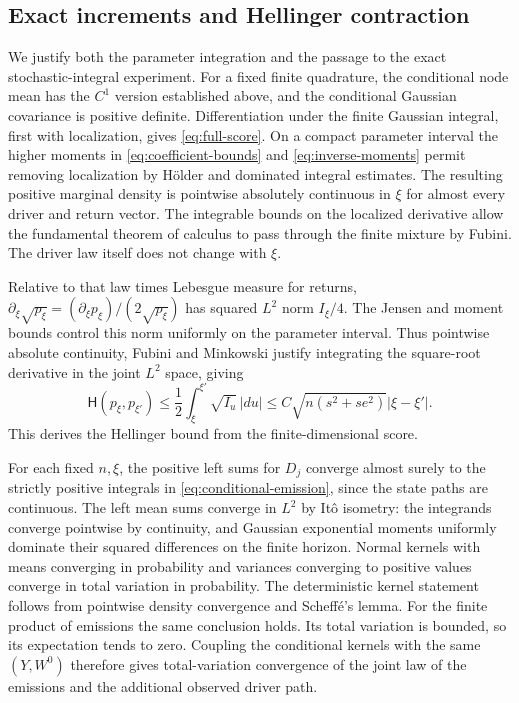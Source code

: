 \documentclass[11pt,a4paper]{amsart}
\theoremstyle{plain}
\theoremstyle{definition}
\theoremstyle{remark}
\newcommand{\Hell}{\mathsf H}
\begin{document}
\subsection{Exact increments and Hellinger contraction}

We justify both the parameter integration and the passage to the exact
stochastic-integral experiment. For a fixed finite quadrature, the
conditional node mean has the $C^1$ version established above, and the
conditional Gaussian covariance is positive definite. Differentiation
under the finite Gaussian integral, first with localization, gives
\eqref{eq:full-score}. On a compact parameter interval the higher moments
in \eqref{eq:coefficient-bounds} and \eqref{eq:inverse-moments} permit
removing localization by H\"older and dominated integral estimates.
The resulting positive marginal density is pointwise absolutely
continuous in $\xi$ for almost every driver and return vector. The
integrable bounds on the localized derivative allow the fundamental
theorem of calculus to pass through the finite mixture by Fubini.
The driver law itself does not change with $\xi$.

Relative to that law times Lebesgue measure for returns,
$\partial_\xi\sqrt{p_\xi}=(\partial_\xi p_\xi)/(2\sqrt{p_\xi})$ has
squared $L^2$ norm $I_\xi/4$. The Jensen and moment bounds control this
norm uniformly on the parameter interval. Thus pointwise absolute
continuity, Fubini and Minkowski justify integrating the square-root
derivative in the joint $L^2$ space, giving
\begin{equation}\label{eq:Hellinger-integral}
 \Hell(p_\xi,p_{\xi'})
 \le\frac12\int_{\xi}^{\xi'}\sqrt{I_u}\,|du|
 \le C\sqrt{n(s^2+se^2)}|\xi-\xi'|.
\end{equation}
This derives the Hellinger bound from the finite-dimensional score.

For each fixed $n,\xi$, the positive left sums for $D_j$ converge almost
surely to the strictly positive integrals in
\eqref{eq:conditional-emission}, since the state paths are continuous.
The left mean sums converge in $L^2$ by It\^o isometry: the integrands
converge pointwise by continuity, and Gaussian exponential moments
uniformly dominate their squared differences on the finite horizon.
Normal kernels with means converging in probability and variances
converging to positive values converge in total variation in probability.
The deterministic kernel statement follows from pointwise density
convergence and Scheff\'e's lemma. For the finite product of emissions the
same conclusion holds. Its total variation is bounded, so its expectation
tends to zero. Coupling the conditional kernels with the same $(Y,W^0)$
therefore gives total-variation convergence of the joint law of the
emissions and the additional observed driver path.
\end{document}
